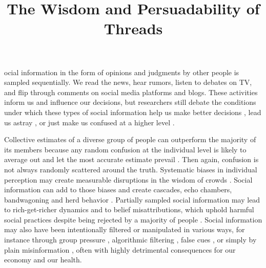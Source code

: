 \documentclass[9pt,twocolumn,twoside,lineno]{article}
\title{The Wisdom and Persuadability of Threads}
\begin{document}
\maketitle
\thispagestyle{firststyle}

ocial information in the form of opinions and judgments by other people is sampled sequentially. We read the news, hear rumors, listen to debates on TV, and flip through comments on social media platforms and blogs. These activities inform us and influence our decisions, but researchers still debate the conditions under which these types of social information help us make better decisions \cite{woolley2010evidence, gurccay2015power, becker2017network, jayles2017social}, lead us astray \cite{caplan2011myth, lorenz2011social, minson2012cost, king2011true, le2018endogenous}, or just make us confused at a higher level \cite{salganik2006experimental, salganik2009web}.

Collective estimates of a diverse group of people can outperform the majority of its members because any random confusion at the individual level is likely to average out and let the most accurate estimate prevail \cite{galton1907vox, muth1961rational, surowiecki2005wisdom, hong2008some}. Then again, confusion is not always randomly scattered around the truth. Systematic biases in individual perception may create measurable disruptions in the wisdom of crowds \cite{izard2008calibrating, nash2014curious, kao2018counteracting}. Social information can add to those biases and create cascades, echo chambers, bandwagoning and herd behavior \cite{anderson1997information, bikhchandani1992theory, bakshy2015exposure, banerjee1992simple}. Partially sampled social information may lead to rich-get-richer dynamics \cite{barabasi1999emergence} and to belief misattributions, which uphold harmful social practices despite being rejected by a majority of people \cite{katz1931students, darley1968bystander, ross1977false, noelle1974spiral, lee2019homophily}. Social information may also have been intentionally filtered or manipulated in various ways, for instance through group pressure \cite{asch1951effects}, algorithmic filtering \cite{pariser2011filter}, false cues \cite{salganik2006experimental, muchnik2013social, hanson1996hits}, or simply by plain misinformation \cite{hendricks2018reality}, often with highly detrimental consequences for our economy and our health.
\end{document}
